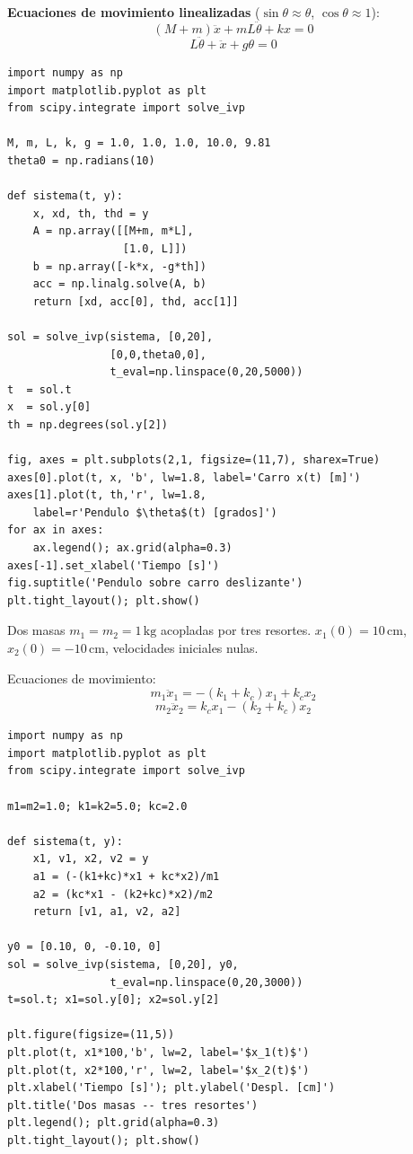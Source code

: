 \documentclass[12pt, a4paper, oneside]{book}
\newcommand{\kg}{\,\text{kg}}
\begin{document}
\begin{solucion}
\textbf{Ecuaciones de movimiento linealizadas} ($\sin\theta\approx\theta$,
$\cos\theta\approx 1$):
\[
  (M+m)\ddot{x} + mL\ddot{\theta} + kx = 0
\]
\[
  L\ddot{\theta} + \ddot{x} + g\theta = 0
\]

\begin{lstlisting}[caption={P\'endulo sobre carro --- Problema 34}]
import numpy as np
import matplotlib.pyplot as plt
from scipy.integrate import solve_ivp

M, m, L, k, g = 1.0, 1.0, 1.0, 10.0, 9.81
theta0 = np.radians(10)

def sistema(t, y):
    x, xd, th, thd = y
    A = np.array([[M+m, m*L],
                  [1.0, L]])
    b = np.array([-k*x, -g*th])
    acc = np.linalg.solve(A, b)
    return [xd, acc[0], thd, acc[1]]

sol = solve_ivp(sistema, [0,20],
                [0,0,theta0,0],
                t_eval=np.linspace(0,20,5000))
t  = sol.t
x  = sol.y[0]
th = np.degrees(sol.y[2])

fig, axes = plt.subplots(2,1, figsize=(11,7), sharex=True)
axes[0].plot(t, x, 'b', lw=1.8, label='Carro x(t) [m]')
axes[1].plot(t, th,'r', lw=1.8,
    label=r'Pendulo $\theta$(t) [grados]')
for ax in axes:
    ax.legend(); ax.grid(alpha=0.3)
axes[-1].set_xlabel('Tiempo [s]')
fig.suptitle('Pendulo sobre carro deslizante')
plt.tight_layout(); plt.show()
\end{lstlisting}
\end{solucion}

\begin{problema}[title={Problema~35}]
Dos masas $m_{1} = m_{2} = 1\kg$ acopladas por tres resortes.
$x_{1}(0) = 10\,\text{cm}$, $x_{2}(0) = -10\,\text{cm}$,
velocidades iniciales nulas.
\end{problema}

\begin{solucion}
Ecuaciones de movimiento:
\[
  m_{1}\ddot{x}_{1} = -(k_{1}+k_{c})x_{1} + k_{c}x_{2}
\]
\[
  m_{2}\ddot{x}_{2} = k_{c}x_{1} - (k_{2}+k_{c})x_{2}
\]

\begin{lstlisting}[caption={Dos masas con tres resortes --- Problema 35}]
import numpy as np
import matplotlib.pyplot as plt
from scipy.integrate import solve_ivp

m1=m2=1.0; k1=k2=5.0; kc=2.0

def sistema(t, y):
    x1, v1, x2, v2 = y
    a1 = (-(k1+kc)*x1 + kc*x2)/m1
    a2 = (kc*x1 - (k2+kc)*x2)/m2
    return [v1, a1, v2, a2]

y0 = [0.10, 0, -0.10, 0]
sol = solve_ivp(sistema, [0,20], y0,
                t_eval=np.linspace(0,20,3000))
t=sol.t; x1=sol.y[0]; x2=sol.y[2]

plt.figure(figsize=(11,5))
plt.plot(t, x1*100,'b', lw=2, label='$x_1(t)$')
plt.plot(t, x2*100,'r', lw=2, label='$x_2(t)$')
plt.xlabel('Tiempo [s]'); plt.ylabel('Despl. [cm]')
plt.title('Dos masas -- tres resortes')
plt.legend(); plt.grid(alpha=0.3)
plt.tight_layout(); plt.show()
\end{lstlisting}
\end{solucion}
\end{document}
